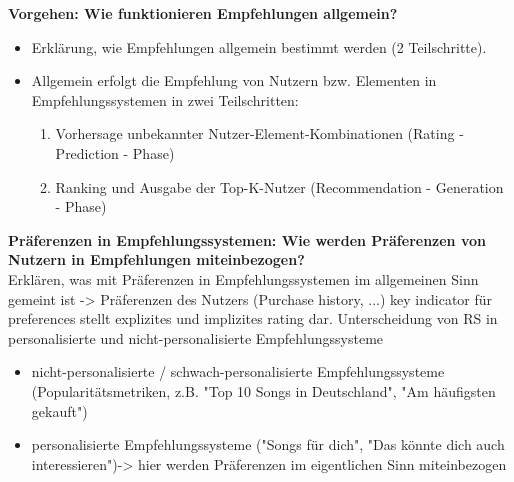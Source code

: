 \textbf{Vorgehen: Wie funktionieren Empfehlungen allgemein?}
\begin{itemize}
    \item Erklärung, wie Empfehlungen allgemein bestimmt werden (2 Teilschritte).
    \item Allgemein erfolgt die Empfehlung von Nutzern bzw. Elementen in Empfehlungssystemen in zwei Teilschritten: %
    \begin{enumerate}
        \item Vorhersage unbekannter Nutzer-Element-Kombinationen (Rating - Prediction - Phase) %
        \item Ranking und Ausgabe der Top-K-Nutzer (Recommendation - Generation - Phase) %
    \end{enumerate}
\end{itemize}

\textbf{Präferenzen in Empfehlungssystemen: Wie werden Präferenzen von Nutzern in Empfehlungen miteinbezogen?}\\
Erklären, was mit Präferenzen in Empfehlungssystemen im allgemeinen Sinn gemeint ist -> Präferenzen des Nutzers (Purchase history, ...) %
key indicator für preferences stellt explizites und implizites rating dar. %
Unterscheidung von RS in personalisierte und nicht-personalisierte Empfehlungssysteme %
\begin{itemize}
    \item nicht-personalisierte / schwach-personalisierte Empfehlungssysteme (Popularitätsmetriken, z.B. "Top 10 Songs in Deutschland", "Am häufigsten gekauft")
    \item personalisierte Empfehlungssysteme ("Songs für dich", "Das könnte dich auch interessieren")-> hier werden Präferenzen im eigentlichen Sinn miteinbezogen
\end{itemize}

